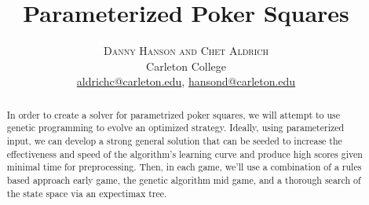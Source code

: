 \documentclass[twoside]{article}
\title{\vspace{-15mm}\fontsize{20pt}{10pt}\selectfont\textbf{Parameterized Poker Squares}} %
\author{
\large
\textsc{Danny Hanson and Chet Aldrich} \\
\normalsize Carleton College \\
\normalsize \href{mailto:aldrichc@carleton.edu}{aldrichc@carleton.edu},
\normalsize \href{mailto:hansond@carleton.edu}{hansond@carleton.edu}
\vspace{-5mm}
}
\date{}
\begin{document}
\maketitle %

\thispagestyle{fancy} %


\begin{abstract}

\noindent In order to create a solver for parametrized poker squares, we will attempt to use genetic programming to evolve an optimized strategy. Ideally, using parameterized input, we can develop a strong general solution that can be seeded to increase the effectiveness and speed of the algorithm's learning curve and produce high scores given minimal time for preprocessing. Then, in each game, we'll use a combination of a rules based approach early game, the genetic algorithm mid game, and a thorough search of the state space via an expectimax tree.

\end{abstract}

\end{document}
